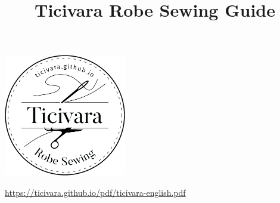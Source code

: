 \documentclass[10pt, twoside, final]{memoir}
\title{Ticivara Robe Sewing Guide}
\begin{document}
\frontmatter

\thispagestyle{empty}
{\centering

  \vspace*{15mm}

  {\chapterTitleFont\fontsize{22}{22}\selectfont\thetitle}

  \vspace*{10mm}

  \includegraphics[width=0.4\textwidth]{./images/logo.jpg}

  \vspace*{10mm}

}


{\centering%
\begin{minipage}{0.7\textwidth}%
  \tableofcontents*%
\end{minipage}%
\par}

\vfill

{%
  \centering\firaSansFont\small\selectfont
  \href{https://ticivara.github.io/pdf/ticivara-english.pdf}{https://ticivara.github.io/pdf/ticivara-english.pdf}%
\par}

\mainmatter









\end{document}

